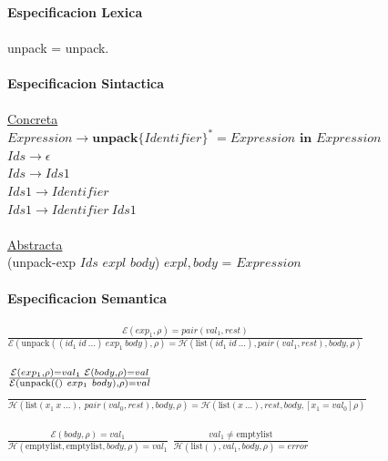 \documentclass{article}
\begin{document}
\begin{itemize}
    \\
    \textbf{Especificacion Lexica}\\
    \\
    \hspace*{10mm} unpack = unpack.\\
    \\
    \textbf{Especificacion Sintactica}\\
    \\
    \hspace*{10mm} \underline{Concreta}\\
    \hspace*{10mm} $Expression\rightarrow\textbf{unpack}\{ Identifier \}^*=Expression\textbf{ in }Expression$\\
    \hspace*{10mm} $Ids\rightarrow\epsilon$\\
    \hspace*{10mm} $Ids\rightarrow Ids1$\\
    \hspace*{10mm} $Ids1\rightarrow Identifier$\\
    \hspace*{10mm} $Ids1\rightarrow Identifier\ Ids1$\\
    \\
    \hspace*{10mm} \underline{Abstracta}\\
    \hspace*{10mm} (unpack-exp $Ids$ $expl$ $body$)\hspace{10mm} $expl,body$ = $Expression$\\
    \\
    \textbf{Especificacion Semantica}\\
    \\
    \hspace*{10mm}
        $\frac
        {\mathcal{E}(exp_1,\rho)=pair(val_1,rest)}
        {\mathcal{E}(\text{unpack}((id_1\ id\ ...)\ exp_1\ body),\rho)=\mathcal{H}(\text{list}(id_1\ id\ ...),pair(val_1,rest),body,\rho)}$\\
    \\
    \hspace*{10mm}
        $\frac
        {\mathcal{E}(exp_1,\rho)=val_1\hspace{1mm}\mathcal{E}(body,\rho)=val}
        {\mathcal{E}(\text{unpack}(()\ exp_1\ body),\rho)=val}$
    \hspace*{10mm}
        $\frac
        {}
        {\mathcal{H}(\text{list}(x_1\ x\ ...),\ pair(val_0,rest),body,\rho)=\mathcal{H}(\text{list}(x\ ...),rest,body,[x_1=val_0]\rho)}$\\
    \\
    \hspace*{10mm}
        $\frac
        {\mathcal{E}(body,\rho)=val_1}
        {\mathcal{H}(\text{emptylist},\text{emptylist},body,\rho)=val_1}$
    \hspace*{10mm}
        $\frac
        {   val_1\neq\text{emptylist}}
        {\mathcal{H}(\text{list}(),val_1,body,\rho)=error}$\\
    \\
    

\end{itemize}
\end{document}
